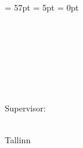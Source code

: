
\begin{titlepage}
\headheight = 57pt
\footskip = 5pt
\headsep = 0pt

\centering
\university\\
\school

\vspace*{4.5 cm}

\begin{center}

\authorName~~\studentcode\\
\vspace*{1.5 cm}

\begin{Large}
\textsc{\textbf{\doctitle}}\\
\end{Large}

\vspace*{1.5 cm}
\doctype\\
\end{center}

\vspace*{0.6 cm}

\begin{flushright}
Supervisor: \supervisor\\\supervisortitle\\
\vspace*{0.2 cm}

\end{flushright}
\vfill

Tallinn \Year
\end{titlepage}

\pagebreak

%
%
%
%
%
%
%
%
%
